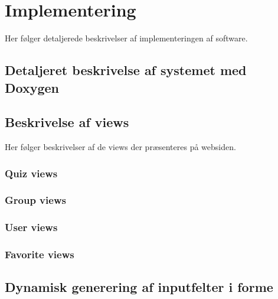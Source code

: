 \chapter{Implementering}

Her følger detaljerede beskrivelser af implementeringen af software.

\section{Detaljeret beskrivelse af systemet med Doxygen}


\section{Beskrivelse af views}\label{sec:views}
Her følger beskrivelser af de views der præsenteres på websiden.
\subsection{Quiz views}





\subsection{Group views}




\subsection{User views}


\subsection{Favorite views}



\section{Dynamisk generering af inputfelter i forme}


